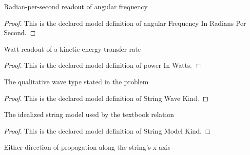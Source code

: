 \begin{definition}
  \label{def:physics:phyx-mini-0293:phyxminiproblems-problemphyxmini0293-angularfrequencyinradianspersecond}
  Radian-per-second readout of angular frequency
\end{definition}
\begin{proof}
  This is the declared model definition of angular Frequency In Radians Per Second.
\end{proof}
\begin{definition}
  \label{def:physics:phyx-mini-0293:phyxminiproblems-problemphyxmini0293-powerinwatts}
  Watt readout of a kinetic-energy transfer rate
\end{definition}
\begin{proof}
  This is the declared model definition of power In Watts.
\end{proof}
\begin{definition}
  \label{def:physics:phyx-mini-0293:phyxminiproblems-problemphyxmini0293-stringwavekind}
  The qualitative wave type stated in the problem
\end{definition}
\begin{proof}
  This is the declared model definition of String Wave Kind.
\end{proof}
\begin{definition}
  \label{def:physics:phyx-mini-0293:phyxminiproblems-problemphyxmini0293-stringmodelkind}
  The idealized string model used by the textbook relation
\end{definition}
\begin{proof}
  This is the declared model definition of String Model Kind.
\end{proof}
\begin{definition}
  \label{def:physics:phyx-mini-0293:phyxminiproblems-problemphyxmini0293-propagationdirection}
  Either direction of propagation along the string's x axis
\end{definition}
